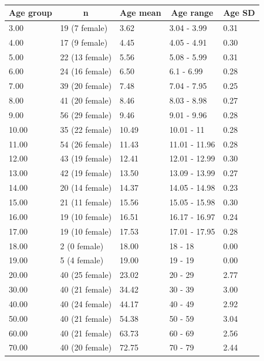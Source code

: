 \documentclass[
  man,floatsintext]{apa6}
\begin{document}
\begin{table}[tbp]

\begin{center}
\begin{threeparttable}

\caption{\label{tab:lifespan_sample}}

\begin{tabular}{lllll}
\toprule
Age group & \multicolumn{1}{c}{n} & \multicolumn{1}{c}{Age mean} & \multicolumn{1}{c}{Age range} & \multicolumn{1}{c}{Age SD}\\
\midrule
3.00 & 19 (7 female) & 3.62 & 3.04 - 3.99 & 0.31\\
4.00 & 17 (9 female) & 4.45 & 4.05 - 4.91 & 0.30\\
5.00 & 22 (13 female) & 5.56 & 5.08 - 5.99 & 0.31\\
6.00 & 24 (16 female) & 6.50 & 6.1 - 6.99 & 0.28\\
7.00 & 39 (20 female) & 7.48 & 7.04 - 7.95 & 0.25\\
8.00 & 41 (20 female) & 8.46 & 8.03 - 8.98 & 0.27\\
9.00 & 56 (29 female) & 9.46 & 9.01 - 9.96 & 0.28\\
10.00 & 35 (22 female) & 10.49 & 10.01 - 11 & 0.28\\
11.00 & 54 (26 female) & 11.43 & 11.01 - 11.96 & 0.28\\
12.00 & 43 (19 female) & 12.41 & 12.01 - 12.99 & 0.30\\
13.00 & 42 (19 female) & 13.50 & 13.09 - 13.99 & 0.27\\
14.00 & 20 (14 female) & 14.37 & 14.05 - 14.98 & 0.23\\
15.00 & 21 (11 female) & 15.56 & 15.05 - 15.98 & 0.30\\
16.00 & 19 (10 female) & 16.51 & 16.17 - 16.97 & 0.24\\
17.00 & 19 (10 female) & 17.53 & 17.01 - 17.95 & 0.28\\
18.00 & 2 (0 female) & 18.00 & 18 - 18 & 0.00\\
19.00 & 5 (4 female) & 19.00 & 19 - 19 & 0.00\\
20.00 & 40 (25 female) & 23.02 & 20 - 29 & 2.77\\
30.00 & 40 (21 female) & 34.42 & 30 - 39 & 3.00\\
40.00 & 40 (24 female) & 44.17 & 40 - 49 & 2.92\\
50.00 & 40 (21 female) & 54.38 & 50 - 59 & 3.04\\
60.00 & 40 (21 female) & 63.73 & 60 - 69 & 2.56\\
70.00 & 40 (20 female) & 72.75 & 70 - 79 & 2.44\\
\bottomrule
\end{tabular}

\end{threeparttable}
\end{center}

\end{table}
\end{document}
